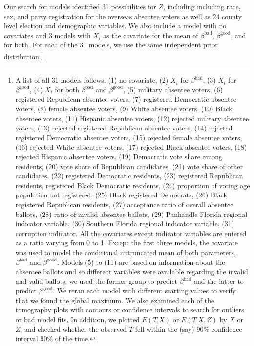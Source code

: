 \documentclass[11pt,titlepage]{article}
\newcommand{\bb}{\beta^{\text{bad}}}
\newcommand{\bg}{\beta^{\text{good}}}
\begin{document}
Our search for models identified 31 possibilities for $Z$, including
including race, sex, and party registration for the overseas absentee
voters as well as 24 county level election and demographic variables.
We also include a model with no covariates and 3 models with $X_i$ as
the covariate for the mean of $\bb$, $\bg$, and for both.  For each of
the 31 models, we use the same independent prior
distribution.\footnote{\label{f:models}A list of all 31 models
  follows: (1) no covariate, (2) $X_i$ for $\bb$, (3) $X_i$ for $\bg$,
  (4) $X_i$ for both $\bb$ and $\bg$, (5) military absentee voters,
  (6) registered Republican absentee voters, (7) registered Democratic
  absentee voters, (8) female absentee voters, (9) White absentee
  voters, (10) Black absentee voters, (11) Hispanic absentee voters,
  (12) rejected military absentee voters, (13) rejected registered
  Republican absentee voters, (14) rejected registered Democratic
  absentee voters, (15) rejected female absentee voters, (16) rejected
  White absentee voters, (17) rejected Black absentee voters, (18)
  rejected Hispanic absentee voters, (19) Democratic vote share among
  residents, (20) vote share of Republican candidates, (21) vote share
  of other candidates, (22) registered Democratic residents, (23)
  registered Republican residents, registered Black Democratic
  residents, (24) proportion of voting age population not registered,
  (25) Black registered Democrats, (26) Black registered Republican
  residents, (27) acceptance ratio of overall absentee ballots, (28)
  ratio of invalid absentee ballots, (29) Panhandle Florida regional
  indicator variable, (30) Southern Florida regional indicator
  variable, (31) corruption indicator. All the covariates except
  indicator variables are entered as a ratio varying from 0 to 1.
  Except the first three models, the covariate was used to model the
  conditional untruncated mean of both parameters, $\bb$ and $\bg$.
  Models (5) to (11) are based on information about the absentee
  ballots and so different variables were available regarding the
  invalid and valid ballots; we used the former group to predict $\bb$
  and the latter to predict $\bg$.  We reran each model with different
  starting values to verify that we found the global maximum.  We also
  examined each of the tomography plots with contours or confidence
  intervals to search for outliers or bad model fits.  In addition, we
  plotted $E(T|X)$ or $E(T|X,Z)$ by $X$ or $Z$, and checked whether
  the observed $T$ fell within the (say) 90\% confidence interval 90\%
  of the time.}
\end{document}
